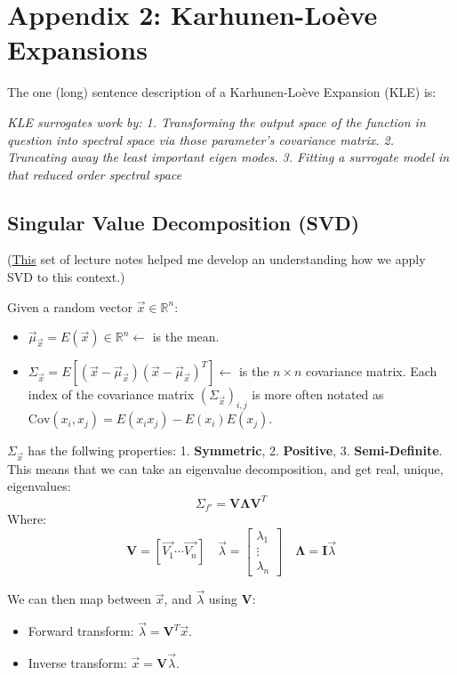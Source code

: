 \section{Appendix 2: Karhunen-Loève Expansions}
The one (long) sentence description of a Karhunen-Loève Expansion (KLE) is: 

\noindent \textit{KLE surrogates work by: 1. Transforming the output space of the function in question into spectral space via those parameter's covariance matrix. 2. Truncating away the least important eigen modes. 3. Fitting a surrogate model in that reduced order spectral space}

\subsection{Singular Value Decomposition (SVD)}
(\href{https://pages.hmc.edu/ruye/MachineLearning/lectures/ch8/node4.html}{This} set of lecture notes helped me develop an understanding how we apply SVD to this context.)

\noindent Given a random vector $\vec{x} \in \mathbb{R}^n$:
\begin{itemize}
    \item $\vec{\mu}_{\vec{x}} = E(\vec{x}) \in \mathbb{R}^n \leftarrow$ is the mean.
    \item $\Sigma_{\vec{x}} = E \left[ (\vec{x} - \vec{\mu}_{\vec{x}}) {(\vec{x} - \vec{\mu}_{\vec{x}})}^T \right] \leftarrow$ is the $n \times n$ covariance matrix. Each index of the covariance matrix $(\Sigma_{\vec{x}})_{i,j}$ is more often notated as $\text{Cov}(x_i, x_j) = E(x_i x_j) - E(x_i) E(x_j)$.
\end{itemize}

\noindent $\Sigma_{\vec{x}}$ has the follwing properties: 1. \textbf{Symmetric}, 2. \textbf{Positive}, 3. \textbf{Semi-Definite}. This means that we can take an eigenvalue decomposition, and get real, unique, eigenvalues:
$$
\Sigma_{f'} = \mathbf{V} \mathbf{\Lambda} \mathbf{V}^T
$$
Where:
$$
\mathbf{V} = \left[ \vec{V_1} \cdots \vec{V_n} \right] \quad
\vec{\lambda} = 
\begin{bmatrix}
    \lambda_1 \\
    \vdots \\
    \lambda_n
\end{bmatrix} \quad
\mathbf{\Lambda} = \mathbf{I} \vec{\lambda}
$$

\noindent We can then map between $\vec{x}$, and $\vec{\lambda}$ using $\mathbf{V}$:
\begin{itemize}
    \item Forward transform: $\vec{\lambda} = \mathbf{V}^T \vec{x}$.
    \item Inverse transform: $\vec{x} = \mathbf{V} \vec{\lambda}$.
\end{itemize}

